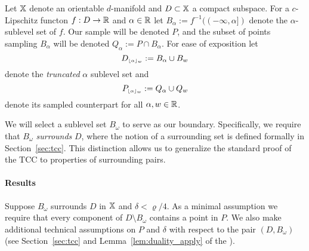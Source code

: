 
Let $\mathbb{X}$ denote an orientable $d$-manifold and $D\subset\mathbb{X}$ a compact subspace.
For a $c$-Lipschitz functon $f : D\to \mathbb{R}$ and $\alpha\in\mathbb{R}$ let $B_\alpha := f^{-1}((-\infty,\alpha])$ denote the $\alpha$-sublevel set of $f$.
Our sample will be denoted $P$, and the subset of points sampling $B_\alpha$ will be denoted $Q_\alpha := P\cap B_\alpha$.
For ease of exposition let
\[ D_{\scriptscriptstyle \lfloor\alpha\rfloor_{w}} := B_\alpha\cup B_w \]
denote the \emph{truncated} $\alpha$ sublevel set and  %
\[ P_{\scriptscriptstyle \lfloor\alpha\rfloor_{w}} := Q_\alpha\cup Q_w\]
denote its sampled counterpart for all $\alpha,w\in\mathbb{R}$.

We will select a sublevel set $B_\omega$ to serve as our boundary.
Specifically, we require that $B_\omega$ \emph{surrounds} $D$, where the notion of a surrounding set is defined formally in Section~\ref{sec:tcc}.
This distinction allows us to generalize the standard proof of the TCC to properties of surrounding pairs.


\paragraph*{Results}

Suppose $B_\omega$ surrounds $D$ in $\mathbb{X}$ and $\delta < \varrho / 4$.
As a minimal assumption we require that every component of $D\setminus B_\omega$ contains a point in $P$.
We also make additional technical assumptions on $P$ and $\delta$ with respect to the pair $(D, B_\omega)$ (see Section~\ref{sec:tcc} and Lemma~\ref{lem:duality_apply} of the \fullversion).

